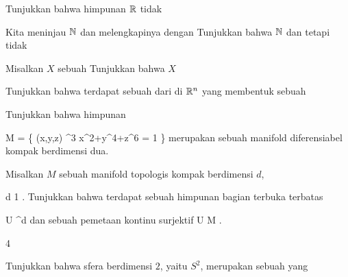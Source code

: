 {}
{

Tunjukkan bahwa himpunan
 ${\mathbb R}$ tidak

}
{} {}

{}
{

Kita meninjau
${\mathbb N}$ dan melengkapinya dengan
Tunjukkan bahwa ${\mathbb N}$
dan
tetapi tidak

}
{} {}

{}
{

Misalkan $X$ sebuah
Tunjukkan bahwa $X$

}
{} {}

{}
{

Tunjukkan bahwa terdapat sebuah
dari
di ${\mathbb R}^n$ yang membentuk sebuah

}
{} {}

{}
{

Tunjukkan bahwa himpunan

\mavergleichskettedisp
{\vergleichskette
{ M
}
{ =} { \left\{ (x,y,z) \in \R^3  \mid   x^2+y^4+z^6 = 1        \right\}
}
{ } {
}
{ } {
}
{ } {
}
}
{}{}{}
merupakan sebuah manifold diferensiabel kompak berdimensi dua.

}
{} {}

{}
{

Misalkan $M$ sebuah manifold topologis kompak berdimensi $d$,

\mavergleichskette
{\vergleichskette
{ d
}
{ \geq }{ 1
}
{  }{
}
{    }{
}
{   }{
}
}
{}{}{.}
Tunjukkan bahwa terdapat sebuah himpunan bagian terbuka terbatas

\mavergleichskette
{\vergleichskette
{ U
}
{ \subseteq }{ \R^d
}
{  }{
}
{    }{
}
{   }{
}
}
{}{}{}
dan sebuah pemetaan kontinu surjektif
\maabbdisp {\varphi} { U } { M
} {}.

}
{} {}


{4}
{

Tunjukkan bahwa sfera berdimensi $2$, yaitu $S^2$, merupakan sebuah
yang

}
{} {}

